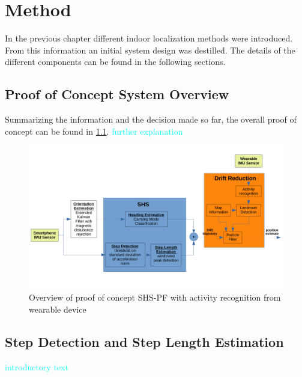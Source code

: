 \chapter{Method}
\label{chap:method}
In the previous chapter different indoor localization methods were introduced. From this information an initial system design was destilled. The details of the different components can be found in the following sections.

\section{Proof of Concept System Overview}
Summarizing the information and the decision made so far, the overall proof of concept can be found in \cref{fig:system_design}.
\textcolor{cyan}{further explanation}

\begin{figure}[H]
	\centering
	\includegraphics[width=\linewidth]{images/system_design}
	\caption{Overview of proof of concept SHS-PF with activity recognition from wearable device}
	\label{fig:system_design}
\end{figure}


\section{Step Detection and Step Length Estimation}

\textcolor{cyan}{introductory text}

